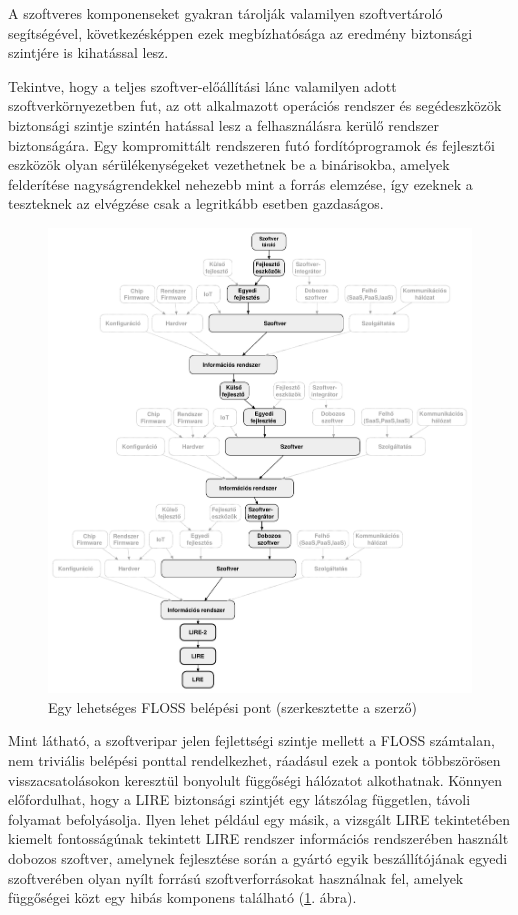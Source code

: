 \documentclass[12pt,magyar,a4paper,oneside]{scrreprt}
\begin{document}
A szoftveres komponenseket gyakran tárolják valamilyen szoftvertároló
segítségével, következésképpen ezek megbízhatósága az eredmény
biztonsági szintjére is kihatással lesz.

Tekintve, hogy a teljes szoftver-előállítási lánc valamilyen adott
szoftverkörnyezetben fut, az ott alkalmazott operációs rendszer és
segédeszközök biztonsági szintje szintén hatással lesz a felhasználásra
kerülő rendszer biztonságára. Egy kompromittált rendszeren futó
fordítóprogramok és fejlesztői eszközök olyan sérülékenységeket
vezethetnek be a binárisokba, amelyek felderítése nagyságrendekkel
nehezebb mint a forrás elemzése, így ezeknek a teszteknek az elvégzése
csak a legritkább esetben gazdaságos.

\begin{figure}
\hypertarget{fig:FLOSSHatuxe1sExp}{%
\centering
\includegraphics{ábrák/FLOSS_hatáspontjai_example.pdf}
\caption{Egy lehetséges FLOSS belépési pont (szerkesztette a
szerző)}\label{fig:FLOSSHatuxe1sExp}
}
\end{figure}

Mint látható, a szoftveripar jelen fejlettségi szintje mellett a FLOSS
számtalan, nem triviális belépési ponttal rendelkezhet, ráadásul ezek a
pontok többszörösen visszacsatolásokon keresztül bonyolult függőségi
hálózatot alkothatnak. Könnyen előfordulhat, hogy a LIRE biztonsági
szintjét egy látszólag független, távoli folyamat befolyásolja. Ilyen
lehet például egy másik, a vizsgált LIRE tekintetében kiemelt
fontosságúnak tekintett LIRE rendszer információs rendszerében használt
dobozos szoftver, amelynek fejlesztése során a gyártó egyik
beszállítójának egyedi szoftverében olyan nyílt forrású
szoftverforrásokat használnak fel, amelyek függőségei közt egy hibás
komponens található (\ref{fig:FLOSSHatuxe1sExp}. ábra).
\end{document}
